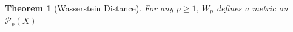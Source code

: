 \documentclass[11pt,a4paper]{article}
\newtheorem{theorem}{Theorem}[section]
\theoremstyle{remark}
\begin{document}
\begin{theorem}[Wasserstein Distance]
For any \( p \geq 1 \), \( W_p \) defines a metric on \( \mathcal{P}_p(X) \)
\end{theorem}


\end{document}
